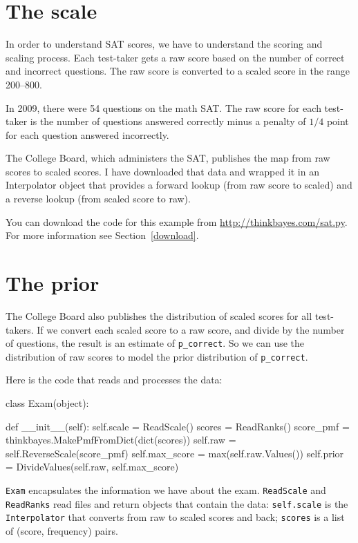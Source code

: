 \documentclass[12pt]{book}
\theoremstyle{exercise}
\begin{document}
\section{The scale}

In order to understand SAT scores, we have to understand the scoring
and scaling process.  Each test-taker gets a raw score based on the
number of correct and incorrect questions.  The raw score is converted
to a scaled score in the range 200--800.

In 2009, there were 54 questions on the math SAT.  The raw score
for each test-taker is the number of questions answered correctly
minus a penalty of $1/4$ point for each question answered incorrectly.

The College Board, which administers the SAT, publishes the
map from raw scores to scaled scores.  I have downloaded that
data and wrapped it in an Interpolator object that provides a forward
lookup (from raw score to scaled) and a reverse lookup (from scaled
score to raw).

You can download the code for this example from
\url{http://thinkbayes.com/sat.py}.
  For more information
see Section~\ref{download}.

\section{The prior}

The College Board also publishes the distribution of scaled scores
for all test-takers.  If we convert each scaled score to a raw score,
and divide by the number of questions, the result is an estimate
of \verb"p_correct".
So we can use the distribution of raw scores to model the
prior distribution of \verb"p_correct".

Here is the code that reads and processes the data:

\begin{code}
class Exam(object):

    def __init__(self):
        self.scale = ReadScale()
        scores = ReadRanks()
        score_pmf = thinkbayes.MakePmfFromDict(dict(scores))
        self.raw = self.ReverseScale(score_pmf)
        self.max_score = max(self.raw.Values())
        self.prior = DivideValues(self.raw, self.max_score)
\end{code}

{\tt Exam} encapsulates the information we have about the exam.
{\tt ReadScale} and {\tt ReadRanks} read files and return
objects that contain the data:
{\tt self.scale} is the {\tt Interpolator} that converts
from raw to scaled scores and back;  {\tt scores} is a list
of (score, frequency) pairs.
\end{document}
